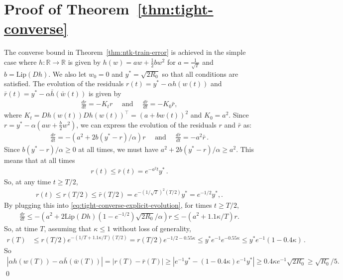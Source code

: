 \documentclass[11pt]{article} %
\newcommand{\R}{\mathbb{R}}
\newcommand{\<}{\langle}
\renewcommand{\>}{\rangle}
\def\barh{\bar{h}}
\def\barr{\bar{r}}
\def\barw{\bar{w}}
\def\barw{\bar{w}}
\newcommand{\Lip}{\mathrm{Lip}}
\theoremstyle{plain}
\theoremstyle{definition}
\theoremstyle{remark}
\begin{document}
\section{Proof of Theorem~\ref{thm:tight-converse}}\label{app:tight-converse}
The converse bound in Theorem~\ref{thm:ntk-train-error} is achieved in the simple case where $h : \R \to \R$ is given by $h(w) = aw + \frac{1}{2}bw^2$ for $a = \frac{1}{\sqrt{T}}$ and $b = \Lip(Dh)$. We also let $w_0 = 0$ and $y^* = \sqrt{2R_0}$ so that all conditions are satisfied.
The evolution of the residuals $r(t) = y^* - \alpha h(w(t))$ and $\barr(t) = y^* - \alpha \barh(\barw(t))$ is given by
\begin{align*}
\frac{dr}{dt} = -K_t r \quad \mbox{ and } \quad \frac{d \barr}{dt} = - K_0 \barr,
\end{align*}
where $K_t = Dh(w(t)) Dh(w(t))^{\top} = (a+bw(t))^2$ and $K_0 = a^2$. Since
$r = y^* - \alpha (aw + \frac{b}{2} w^2)$, we can express the evolution of the residuals $r$ and $\barr$ as:
\begin{align}\label{eq:tight-converse-explicit-evolution}
\frac{dr}{dt} = - (a^2 + 2b(y^* - r) / \alpha) r \quad \mbox{ and } \quad\frac{d\barr}{dt} = -a^2 \barr\,.
\end{align}
Since $b (y^* - r) / \alpha \geq 0$ at all times, we must have $a^2 + 2b(y^* - r) / \alpha \geq a^2$. This means that at all times
\begin{align*}
r(t) \leq \barr(t) = e^{-a^2 t} y^*\,.
\end{align*}
So, at any time $t \geq T / 2$,
\begin{align*}
r(t) \leq r(T / 2) \leq \barr(T / 2) = e^{-(1/\sqrt{T})^2 (T / 2)} y^* = e^{-1/2} y^*,.
\end{align*}
By plugging this into \eqref{eq:tight-converse-explicit-evolution}, for times $t \geq T / 2$,
\begin{align*}
\frac{dr}{dt} \leq -(a^2 + 2\Lip(Dh) (1 - e^{-1/2})\sqrt{2R_0} / \alpha) r \leq -(a^2 + 1.1 \kappa / T) r.
\end{align*}
So, at time $T$, assuming that $\kappa \leq 1$ without loss of generality,
\begin{align*}
r(T) &\leq r(T/2) e^{-(1 / T + 1.1 \kappa / T) (T/2)} = r(T/2) e^{-1/2 - 0.55\kappa} \leq y^* e^{-1} e^{-0.55\kappa} \leq y^* e^{-1} (1 - 0.4\kappa)\,.
\end{align*}
So
\begin{align*}
|\alpha h(w(T)) - \alpha \bar{h}(\barw(T))| = |r(T) - \barr(T)| \geq |e^{-1} y^* - (1-0.4\kappa) e^{-1} y^*| \geq 0.4\kappa e^{-1} \sqrt{2R_0} \geq \sqrt{R_0} / 5.
\end{align*}
\qed
\end{document}
